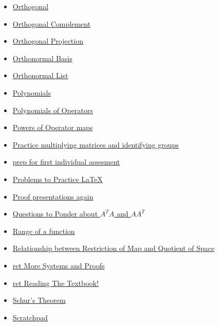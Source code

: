 \documentclass[11pt]{article}
\begin{document}
\begin{itemize}
\begin{itemize}
\begin{itemize}
\item \href{mathematics/linear\_algebra/KBrefOrthogonal.org}{Orthogonal}
\item \href{mathematics/linear\_algebra/KBrefOrthogonalComplement.org}{Orthogonal Complement}
\item \href{mathematics/linear\_algebra/KBrefOrthogonalProjection.org}{Orthogonal Projection}
\item \href{mathematics/linear\_algebra/KBrefOrthonormalBasis.org}{Orthonormal Basis}
\item \href{mathematics/linear\_algebra/KBrefOrthonormal.org}{Orthonormal List}
\item \href{mathematics/linear\_algebra/KBrefPolynomial.org}{Polynomials}
\item \href{mathematics/linear\_algebra/KBrefPolynomialOfOperators.org}{Polynomials of Operators}
\item \href{mathematics/linear\_algebra/KBrefOperatorExponents.org}{Powers of Operator maps}
\item \href{mathematics/linear\_algebra/KBe2020math530retPracticeMultiplyMatrixIdentfyGroups.org}{Practice multiplying matrices and identifying groups}
\item \href{mathematics/linear\_algebra/KBe20math530refIndividualAsssesment1.org}{prep for first individual assesment}
\item \href{mathematics/linear\_algebra/20math530retProblemsPracticeLaTeX.org}{Problems to Practice \LaTeX{}}
\item \href{mathematics/linear\_algebra/KBe20math530flo15.org}{Proof presentations again}
\item \href{mathematics/linear\_algebra/KBe21math530retMatrixTransposePonderQuestions.org}{Questions to Ponder about \(A^TA\) and \(AA^T\)}
\item \href{mathematics/linear\_algebra/KBrefFunctionRange.org}{Range of a function}
\item \href{mathematics/linear\_algebra/KBcrefRestrictionAndQuotientOperators.org}{Relationship between Restriction of Map and Quotient of Space}
\item \href{mathematics/linear\_algebra/KBe20math530retMoreSystemsAndProofs.org}{ret More Systems and Proofs}
\item \href{mathematics/linear\_algebra/20math530retReadingTheTextbook.org}{ret Reading The Textbook!}
\item \href{mathematics/linear\_algebra/KBrefSchursTheorem.org}{Schur's Theorem}
\item \href{mathematics/linear\_algebra/20math530retScratchpad.org}{Scratchpad}

\end{itemize}
\end{itemize}
\end{itemize}
\end{document}
